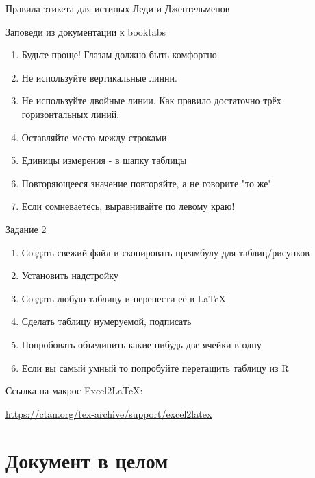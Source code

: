 \documentclass[aspectratio=169]{beamer} %
\begin{document}
\begin{frame}{Правила этикета для истиных Леди и Джентельменов} 
\begin{block}{Заповеди из документации к booktabs}
\begin{enumerate}
\item Будьте проще! Глазам должно быть комфортно.
\item Не используйте вертикальные линни.
\item Не используйте двойные линии. Как правило достаточно трёх горизонтальных линий.
\item Оставляйте место между строками
\item Единицы измерения - в шапку таблицы
\item Повторяющееся значение повторяйте, а не говорите "то же"
\item Если сомневаетесь, выравнивайте по левому краю!
\end{enumerate}
\end{block}
\end{frame}


\begin{frame}[plain]{Задание 2} 

\begin{enumerate}
	\item  Создать свежий файл и скопировать преамбулу для таблиц/рисунков
	\item  Установить надстройку
	\item  Создать любую таблицу и перенести её в \LaTeX
	\item  Сделать таблицу нумеруемой, подписать
	\item  Попробовать объединить какие-нибудь две ячейки в одну
	\item  Если вы самый умный то попробуйте перетащить таблицу из R 
\end{enumerate}

\begin{block}{Ссылка на макрос Excel2LaTeX:}
	\vspace{3mm}
	\centerline {\url{https://ctan.org/tex-archive/support/excel2latex}}
	\vspace{3mm}
\end{block}
\end{frame}

\section{Документ в целом} 
\end{document}
